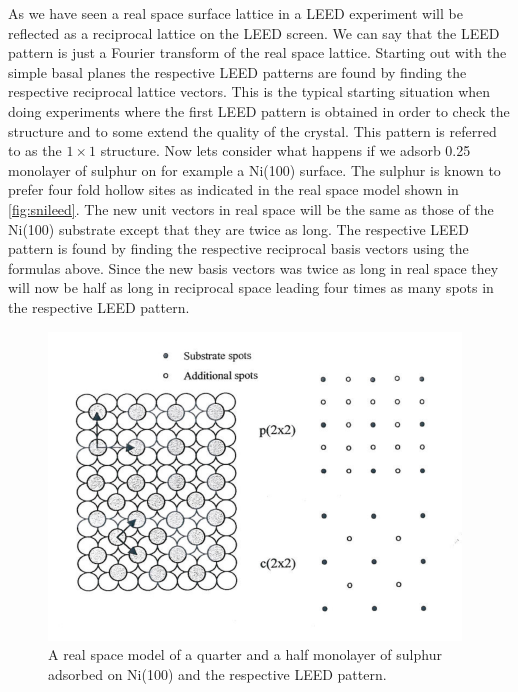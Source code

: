 As we have seen a real space surface lattice in a LEED experiment will be reflected as a reciprocal lattice on the LEED screen. We can say that the LEED pattern is just a Fourier transform of the real space lattice. Starting out with the  simple basal planes the respective LEED patterns are found by finding the respective reciprocal lattice vectors. This is the typical starting situation when doing experiments where the first LEED pattern is obtained in order to check the structure and  to some extend the quality of the crystal. This pattern is referred to as the $1\times 1$ structure. Now lets consider what happens if we adsorb 0.25 monolayer of sulphur on for example a Ni(100) surface. The sulphur is known to prefer four fold hollow sites as indicated in the real space model shown in \autoref{fig:snileed}. The new unit vectors in real space will be the same as those of the Ni(100) substrate except that they are twice as long. The respective LEED pattern is found by finding the  respective reciprocal basis vectors using the formulas above. Since the new basis vectors was twice as long in real space they will now be half as long in reciprocal space leading four times as many spots in the respective LEED pattern.

\begin{figure}[h!]
	\begin{center}
	\includegraphics[scale=4]{figures/09_11.png}
	\caption{A real space model of a quarter and a half monolayer of sulphur adsorbed on Ni(100) and the respective LEED pattern.}
	\label{fig:snileed}
	\end{center}
\end{figure}

